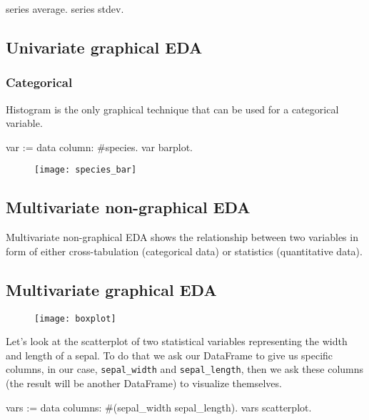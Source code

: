 \documentclass{article}
\begin{document}
\begin{multicols}{2}
\begin{code}{}
series average. 
series stdev.
\end{code}

\subsection{Univariate graphical EDA}
\subsubsection{Categorical}

Histogram is the only graphical technique that can be used for a categorical variable.

\begin{code}{}
var := data column: #species.
var barplot.
\end{code}

\begin{figure}[H]
  \begin{center}
  \texttt{[image: species\_bar]}
  \end{center}
\end{figure}

\subsection{Multivariate non-graphical EDA}
Multivariate non-graphical EDA shows the relationship between two variables in form of either cross-tabulation (categorical data) or statistics (quantitative data).

\subsection{Multivariate graphical EDA}
\begin{figure}[H]
  \begin{center}
  \texttt{[image: boxplot]}
  \end{center}
\end{figure}

Let's look at the scatterplot of two statistical variables representing the width and length of a sepal. To do that we ask our DataFrame to give us specific columns, in our case, \texttt{sepal\_width} and \texttt{sepal\_length}, then we ask these columns (the result will be another DataFrame) to visualize themselves.

\begin{code}{}
vars := data columns: #(sepal_width sepal_length).
vars scatterplot.
\end{code}


\end{multicols}
\end{document}
